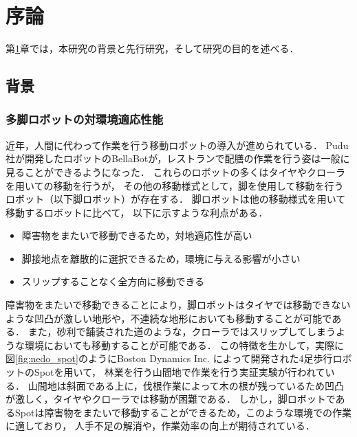 ﻿
\chapter{序論}\label{chapter:序論}
第\ref{chapter:序論}章では，本研究の背景と先行研究，そして研究の目的を述べる．


\section{背景}


\subsection{多脚ロボットの対環境適応性能}
近年，人間に代わって作業を行う移動ロボットの導入が進められている．
Pudu社が開発したロボットのBellaBotが，レストランで配膳の作業を行う姿は一般に見ることができるようになった．
これらのロボットの多くはタイヤやクローラを用いての移動を行うが，
その他の移動様式として，脚を使用して移動を行うロボット（以下脚ロボット）が存在する．
脚ロボットは他の移動様式を用いて移動するロボットに比べて，
以下に示すような利点がある\cite{Locomotion_for_difficult_terrain}．

\begin{itemize}
  \item 障害物をまたいで移動できるため，対地適応性が高い
  \item 脚接地点を離散的に選択できるため，環境に与える影響が小さい
  \item スリップすることなく全方向に移動できる
\end{itemize}

障害物をまたいで移動できることにより，脚ロボットはタイヤでは移動できないような凹凸が激しい地形や，不連続な地形においても移動することが可能である．
また，砂利で舗装された道のような，クローラではスリップしてしまうような環境においても移動することが可能である．
この特徴を生かして，実際に図\ref{fig:nedo_spot}のようにBoston Dynamics Inc. によって開発された4足歩行ロボットのSpot\cite{Boston_Dynamics_Spot}を用いて，
林業を行う山間地で作業を行う実証実験が行われている\cite{NEDO}．
山間地は斜面である上に，伐根作業によって木の根が残っているため凹凸が激しく，タイヤやクローラでは移動が困難である．
しかし，脚ロボットであるSpotは障害物をまたいで移動することができるため，このような環境での作業に適しており，
人手不足の解消や，作業効率の向上が期待されている．

